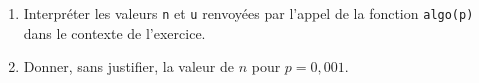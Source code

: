 \documentclass[10pt]{article}
\begin{document}
\begin{enumerate}
	\begin{enumerate}
		\item Interpréter les valeurs \texttt{n} et \texttt{u} renvoyées par l'appel de la fonction \texttt{algo(p)} dans le contexte de l'exercice.
		\item Donner, sans justifier, la valeur de $n$ pour $p=0,001$.
	\end{enumerate}
\end{enumerate}
\end{document}
